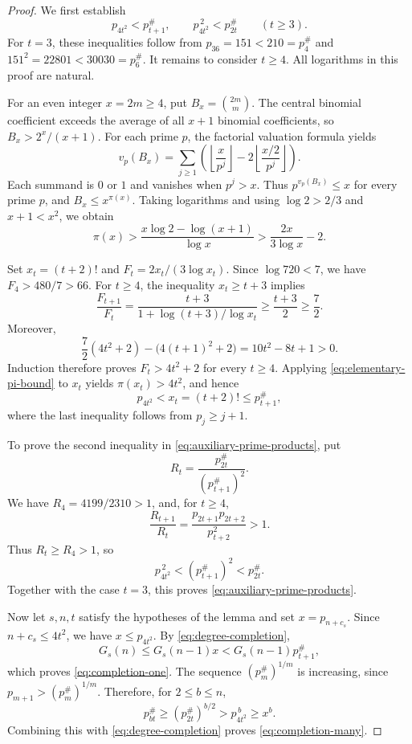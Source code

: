 \documentclass[11pt,onecolumn]{IEEEtran}
\newcommand{\primorial}[1]{p_{#1}^{\#}}
\begin{document}
\begin{proof}
We first establish
\begin{equation}
\label{eq:auxiliary-prime-products}
p_{4t^2}<\primorial{t+1},
\qquad
p_{4t^2}^{\,2}<\primorial{2t}
\qquad(t\ge3).
\end{equation}
For $t=3$, these inequalities follow from
$p_{36}=151<210=\primorial{4}$ and
$151^2=22801<30030=\primorial{6}$.
It remains to consider $t\ge4$. All logarithms in this proof are natural.

For an even integer $x=2m\ge4$, put $B_x=\binom{2m}{m}$.
The central binomial coefficient exceeds the average of all
$x+1$ binomial coefficients, so $B_x>2^x/(x+1)$.
For each prime $p$, the factorial valuation formula yields
\[
v_p(B_x)=\sum_{j\ge1}
\left(\left\lfloor\frac{x}{p^j}\right\rfloor
      -2\left\lfloor\frac{x/2}{p^j}\right\rfloor\right).
\]
Each summand is $0$ or $1$ and vanishes when $p^j>x$.
Thus $p^{v_p(B_x)}\le x$ for every prime $p$, and
$B_x\le x^{\pi(x)}$. Taking logarithms and using
$\log2>2/3$ and $x+1<x^2$, we obtain
\begin{equation}
\label{eq:elementary-pi-bound}
\pi(x)>
\frac{x\log2-\log(x+1)}{\log x}
>\frac{2x}{3\log x}-2.
\end{equation}

Set $x_t=(t+2)!$ and $F_t=2x_t/(3\log x_t)$.
Since $\log720<7$, we have $F_4>480/7>66$.
For $t\ge4$, the inequality $x_t\ge t+3$ implies
\[
\frac{F_{t+1}}{F_t}
=\frac{t+3}{1+\log(t+3)/\log x_t}
\ge\frac{t+3}{2}\ge\frac72.
\]
Moreover,
\[
\frac72(4t^2+2)-\bigl(4(t+1)^2+2\bigr)
=10t^2-8t+1>0.
\]
Induction therefore proves $F_t>4t^2+2$ for every $t\ge4$.
Applying \eqref{eq:elementary-pi-bound} to $x_t$ yields
$\pi(x_t)>4t^2$, and hence
\[
p_{4t^2}<x_t=(t+2)!\le\primorial{t+1},
\]
where the last inequality follows from $p_j\ge j+1$.

To prove the second inequality in
\eqref{eq:auxiliary-prime-products}, put
\[
R_t=\frac{\primorial{2t}}{(\primorial{t+1})^2}.
\]
We have $R_4=4199/2310>1$, and, for $t\ge4$,
\[
\frac{R_{t+1}}{R_t}
=\frac{p_{2t+1}p_{2t+2}}{p_{t+2}^2}>1.
\]
Thus $R_t\ge R_4>1$, so
\[
p_{4t^2}^{\,2}<(\primorial{t+1})^2<\primorial{2t}.
\]
Together with the case $t=3$, this proves
\eqref{eq:auxiliary-prime-products}.

Now let $s,n,t$ satisfy the hypotheses of the lemma and set
$x=p_{n+c_s}$. Since $n+c_s\le4t^2$, we have $x\le p_{4t^2}$.
By \eqref{eq:degree-completion},
\[
G_s(n)\le G_s(n-1)x
<G_s(n-1)\primorial{t+1},
\]
which proves \eqref{eq:completion-one}.
The sequence $(\primorial{m})^{1/m}$ is increasing, since
$p_{m+1}>(\primorial{m})^{1/m}$. Therefore, for $2\le b\le n$,
\[
\primorial{bt}\ge(\primorial{2t})^{b/2}
>p_{4t^2}^{\,b}\ge x^b.
\]
Combining this with \eqref{eq:degree-completion} proves
\eqref{eq:completion-many}.
\end{proof}
\end{document}
